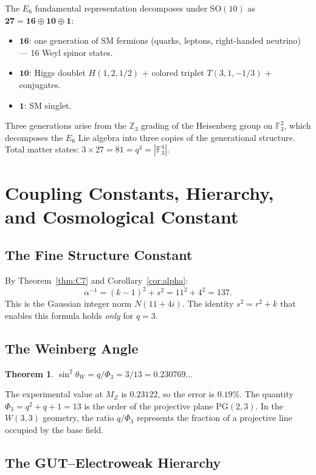 \documentclass[12pt]{article}
\newtheorem{theorem}{Theorem}[section]
\begin{document}
The $E_6$ fundamental representation decomposes under $\mathrm{SO}(10)$ as
$\mathbf{27} = \mathbf{16} \oplus \mathbf{10} \oplus \mathbf{1}$:
\begin{itemize}
\item $\mathbf{16}$: one generation of SM fermions (quarks, leptons,
  right-handed neutrino) --- 16 Weyl spinor states.
\item $\mathbf{10}$: Higgs doublet $H(1,2,1/2)$ + colored triplet
  $T(3,1,-1/3)$ + conjugates.
\item $\mathbf{1}$: SM singlet.
\end{itemize}

Three generations arise from the $\mathbb{Z}_3$ grading of the Heisenberg
group on $\mathbb{F}_3^2$, which decomposes the $E_6$ Lie algebra into
three copies of the generational structure. Total matter states:
$3 \times 27 = 81 = q^4 = |\mathbb{F}_3^4|$.

\section{Coupling Constants, Hierarchy, and Cosmological Constant}
\label{sec:couplings}

\subsection{The Fine Structure Constant}

By Theorem~\ref{thm:C7} and Corollary~\ref{cor:alpha}:
\[
  \alpha^{-1} = (k-1)^2 + s^2 = 11^2 + 4^2 = 137.
\]
This is the Gaussian integer norm $N(11 + 4i)$. The identity
$s^2 = r^2 + k$ that enables this formula holds \emph{only} for $q = 3$.

\subsection{The Weinberg Angle}

\begin{theorem}
$\sin^2\theta_W = q/\Phi_3 = 3/13 = 0.230769\ldots$
\end{theorem}

The experimental value at $M_Z$ is $0.23122$, so the error is $0.19\%$.
The quantity $\Phi_3 = q^2 + q + 1 = 13$ is the order of the projective
plane $\mathrm{PG}(2,3)$. In the $W(3,3)$ geometry, the ratio $q/\Phi_3$
represents the fraction of a projective line occupied by the base field.

\subsection{The GUT--Electroweak Hierarchy}
\end{document}
